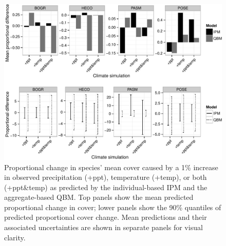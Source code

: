 \documentclass[12pt,]{article}
\begin{document}
\begin{figure}[htbp]
\centering
\includegraphics{components/figure/manuscript-figure_3.pdf}
\caption{Proportional change in species' mean cover caused by a 1\%
increase in observed precipitation (+ppt), temperature (+temp), or both
(+ppt\&temp) as predicted by the individual-based IPM and the
aggregate-based QBM. Top panels show the mean predicted proportional
change in cover; lower panels show the 90\% quantiles of predicted
proportional cover change. Mean predictions and their associated
uncertainties are shown in separate panels for visual clarity.}
\end{figure}
\end{document}
